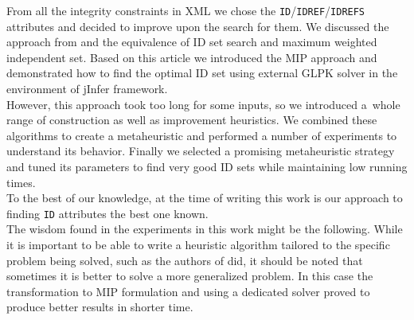 
From all the integrity constraints in XML we chose the \texttt{ID}/\.\texttt{IDREF}/\.\texttt{IDREFS} attributes and decided to improve upon the search for them. We discussed the approach from \cite{fidax} and the equivalence of ID set search and maximum weighted independent set. Based on this article we introduced the MIP approach and demonstrated how to find the optimal ID set using external GLPK solver in the environment of jInfer framework.\\

However, this approach took too long for some inputs, so we introduced a~whole range of construction as well as improvement heuristics. We combined these algorithms to create a metaheuristic and performed a number of experiments to understand its behavior. Finally we selected a promising metaheuristic strategy and tuned its parameters to find very good ID sets while maintaining low running times.\\

To the best of our knowledge, at the time of writing this work is our approach to finding \texttt{ID} attributes the best one known.\\

The wisdom found in the experiments in this work might be the following. While it is important to be able to write a heuristic algorithm tailored to the specific problem being solved, such as the authors of \cite{fidax} did, it should be noted that sometimes it is better to solve a more generalized problem. In this case the transformation to MIP formulation and using a dedicated solver proved to produce better results in shorter time.